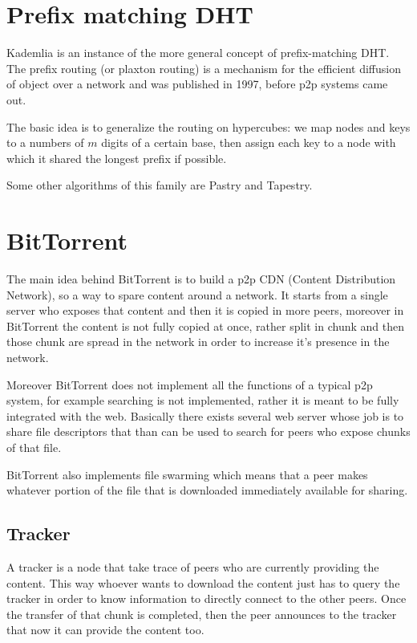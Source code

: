 \section{Prefix matching DHT}
Kademlia is an instance of the more general concept of prefix-matching DHT.
The prefix routing (or plaxton routing) is a mechanism for the efficient diffusion of object over a network and was published in 1997, before p2p systems came out.

The basic idea is to generalize the routing on hypercubes: we map nodes and keys to a numbers of $m$ digits of a certain base, then assign each key to a node with which it shared the longest prefix if possible.

Some other algorithms of this family are Pastry and Tapestry.

\section{BitTorrent}
The main idea behind BitTorrent is to build a p2p CDN (Content Distribution Network), so a way to spare content around a network.
It starts from a single server who exposes that content and then it is copied in more peers, moreover in BitTorrent the content is not fully copied at once, rather split in chunk and then those chunk are spread in the network in order to increase it's presence in the network.

Moreover BitTorrent does not implement all the functions of a typical p2p system, for example searching is not implemented, rather it is meant to be fully integrated with the web.
Basically there exists several web server whose job is to share file descriptors that than can be used to search for peers who expose chunks of that file.

BitTorrent also implements file swarming which means that a peer makes whatever portion of the file that is downloaded immediately available for sharing.

\subsection{Tracker}
A tracker is a node that take trace of peers who are currently providing the content.
This way whoever wants to download the content just has to query the tracker in order to know information to directly connect to the other peers.
Once the transfer of that chunk is completed, then the peer announces to the tracker that now it can provide the content too.

